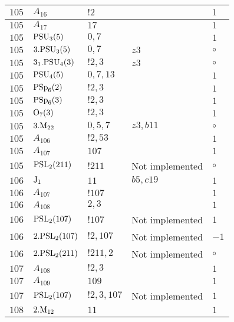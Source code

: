 \documentclass[a4paper, 11pt]{article}
\begin{document}
\begin{longtable}{lllll}
        $ 105 $ & $ A_{16} $ & $ ! 2 $ & $ ~ $ & $ 1$ \\ \hline
        $ 105 $ & $ A_{17} $ & $ 17 $ & $ ~ $ & $ 1$ \\ \hline
        $ 105 $ & $ {\rm PSU}_{3}(5) $ & $ 0,7 $ & $ ~ $ & $ 1$ \\ \hline
        $ 105 $ & $ 3.{\rm PSU}_{3}(5) $ & $ 0,7 $ & $ z3 $ &  $\circ$ \\ \hline
        $ 105 $ & $ 3_1.{\rm PSU}_{4}(3) $ & $ ! 2,3 $ & $ z3 $ &  $\circ$ \\ \hline
        $ 105 $ & $ {\rm PSU}_{4}(5) $ & $ 0,7,13 $ & $ ~ $ & $ 1$ \\ \hline
        $ 105 $ & $ {\rm PSp}_{6}(2) $ & $ ! 2,3 $ & $ ~ $ & $ 1$ \\ \hline
        $ 105 $ & $ {\rm PSp}_{6}(3) $ & $ ! 2,3 $ & $ ~ $ & $ 1$ \\ \hline
        $ 105 $ & $ {\rm O}_{7}(3) $ & $ ! 2,3 $ & $ ~ $ & $ 1$ \\ \hline
        $ 105 $ & $ 3.{\rm M}_{22} $ & $ 0,5,7 $ & $ z3, b11 $ &  $\circ$ \\ \hline
        $ 105 $ & $ A_{106} $ & $ !2, 53 $ & $ ~ $ & $ 1$ \\ \hline
        $ 105 $ & $ A_{107} $ & $ 107 $ & $ ~ $ & $ 1$ \\ \hline
        $ 105 $ & $ {\rm PSL}_{2}(211) $ & $ !211 $ &  Not implemented &  $\circ$ \\ \hline
        $ 106 $ & $ {\rm J}_1 $ & $ 11 $ & $ b5, c19 $ & $ 1$ \\ \hline
        $ 106 $ & $ A_{107} $ & $ !107 $ & $ ~ $ & $ 1$ \\ \hline
        $ 106 $ & $ A_{108} $ & $ 2, 3 $ & $ ~ $ & $ 1$ \\ \hline
        $ 106 $ & $ {\rm PSL}_{2}(107) $ & $ !107 $ &  Not implemented & $ 1$ \\ \hline
        $ 106 $ & $ 2.{\rm PSL}_{2}(107) $ & $ !2, 107 $ &  Not implemented & $ -1$ \\ \hline
        $ 106 $ & $ 2.{\rm PSL}_{2}(211) $ & $ !211, 2 $ &  Not implemented &  $\circ$ \\ \hline
        $ 107 $ & $ A_{108} $ & $ !2, 3 $ & $ ~ $ & $ 1$ \\ \hline
        $ 107 $ & $ A_{109} $ & $ 109 $ & $ ~ $ & $ 1$ \\ \hline
        $ 107 $ & $ {\rm PSL}_{2}(107) $ & $ !2, 3, 107 $ &  Not implemented & $ 1$ \\ \hline
        $ 108 $ & $ 2.{\rm M}_{12} $ & $ 11 $ & $ ~ $ & $ 1$ \\ \hline

\end{longtable}
\end{document}
